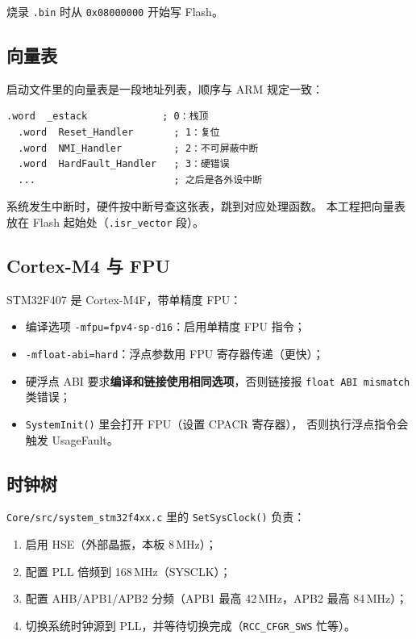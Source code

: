 烧录 \texttt{.bin} 时从 \texttt{0x08000000} 开始写 Flash。

\subsection{向量表}

启动文件里的向量表是一段地址列表，顺序与 ARM 规定一致：

\begin{lstlisting}[style=generic]
  .word  _estack             ; 0：栈顶
  .word  Reset_Handler       ; 1：复位
  .word  NMI_Handler         ; 2：不可屏蔽中断
  .word  HardFault_Handler   ; 3：硬错误
  ...                        ; 之后是各外设中断
\end{lstlisting}

系统发生中断时，硬件按中断号查这张表，跳到对应处理函数。
本工程把向量表放在 Flash 起始处（\texttt{.isr\_vector} 段）。

\subsection{Cortex-M4 与 FPU}

STM32F407 是 Cortex-M4F，带单精度 FPU：

\begin{itemize}
  \item 编译选项 \texttt{-mfpu=fpv4-sp-d16}：启用单精度 FPU 指令；
  \item \texttt{-mfloat-abi=hard}：浮点参数用 FPU 寄存器传递（更快）；
  \item 硬浮点 ABI 要求\textbf{编译和链接使用相同选项}，否则链接报
        \texttt{float ABI mismatch} 类错误；
  \item \texttt{SystemInit()} 里会打开 FPU（设置 CPACR 寄存器），
        否则执行浮点指令会触发 UsageFault。
\end{itemize}

\subsection{时钟树}

\texttt{Core/src/system\_stm32f4xx.c} 里的 \texttt{SetSysClock()} 负责：

\begin{enumerate}
  \item 启用 HSE（外部晶振，本板 8\,MHz）；
  \item 配置 PLL 倍频到 168\,MHz（SYSCLK）；
  \item 配置 AHB/APB1/APB2 分频（APB1 最高 42\,MHz，APB2 最高 84\,MHz）；
  \item 切换系统时钟源到 PLL，并等待切换完成（\texttt{RCC\_CFGR\_SWS} 忙等）。
\end{enumerate}

